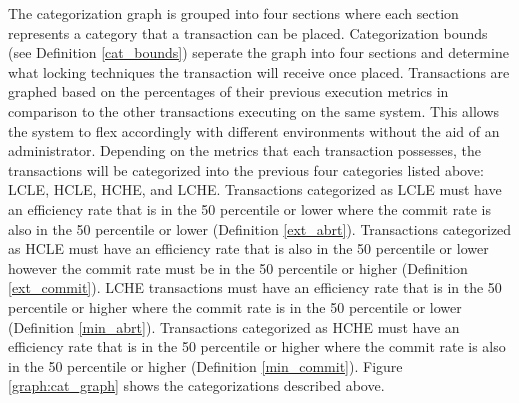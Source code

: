 \documentclass[conference]{IEEEtran}
\begin{document}
The categorization graph is grouped into four sections where each section represents a category that a transaction can be placed. Categorization bounds (see Definition \ref{cat_bounds}) seperate the graph into four sections and determine what locking techniques the transaction will receive once placed. Transactions are graphed based on the percentages of their previous execution metrics in comparison to the other transactions executing on the same system. This allows the system to flex accordingly with different environments without the aid of an administrator. Depending on the metrics that each transaction possesses, the transactions will be categorized into the previous four categories listed above: LCLE, HCLE, HCHE, and LCHE. Transactions categorized as LCLE must have an efficiency rate that is in the 50 percentile or lower where the commit rate is also in the 50 percentile or lower (Definition \ref{ext_abrt}). Transactions categorized as HCLE must have an efficiency rate that is also in the 50 percentile or lower however the commit rate must be in the 50 percentile or higher (Definition \ref{ext_commit}). LCHE transactions must have an efficiency rate that is in the 50 percentile or higher where the commit rate is in the 50 percentile or lower (Definition \ref{min_abrt}). Transactions categorized as HCHE must have an efficiency rate that is in the 50 percentile or higher where the commit rate is also in the 50 percentile or higher (Definition \ref{min_commit}). Figure \ref{graph:cat_graph} shows the categorizations described above.
\end{document}
